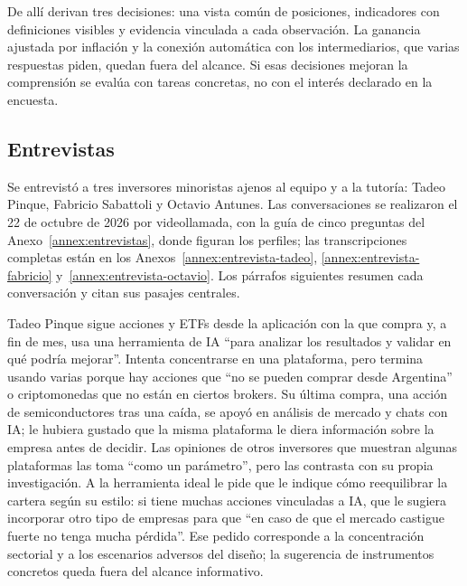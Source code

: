 De allí derivan tres decisiones: una vista común de posiciones, indicadores con definiciones visibles y evidencia vinculada a cada observación. La ganancia ajustada por inflación y la conexión automática con los intermediarios, que varias respuestas piden, quedan fuera del alcance. Si esas decisiones mejoran la comprensión se evalúa con tareas concretas, no con el interés declarado en la encuesta.

\subsection{Entrevistas}\label{subsec:entrevistas}

Se entrevistó a tres inversores minoristas ajenos al equipo y a la tutoría: Tadeo Pinque, Fabricio Sabattoli y Octavio Antunes. Las conversaciones se realizaron el 22 de octubre de 2026 por videollamada, con la guía de cinco preguntas del Anexo~\ref{annex:entrevistas}, donde figuran los perfiles; las transcripciones completas están en los Anexos~\ref{annex:entrevista-tadeo}, \ref{annex:entrevista-fabricio} y~\ref{annex:entrevista-octavio}. Los párrafos siguientes resumen cada conversación y citan sus pasajes centrales.

Tadeo Pinque sigue acciones y ETFs desde la aplicación con la que compra y, a fin de mes, usa una herramienta de IA \enquote{para analizar los resultados y validar en qué podría mejorar}. Intenta concentrarse en una plataforma, pero termina usando varias porque hay acciones que \enquote{no se pueden comprar desde Argentina} o criptomonedas que no están en ciertos brokers. Su última compra, una acción de semiconductores tras una caída, se apoyó en análisis de mercado y chats con IA; le hubiera gustado que la misma plataforma le diera información sobre la empresa antes de decidir. Las opiniones de otros inversores que muestran algunas plataformas las toma \enquote{como un parámetro}, pero las contrasta con su propia investigación. A la herramienta ideal le pide que le indique cómo reequilibrar la cartera según su estilo: si tiene muchas acciones vinculadas a IA, que le sugiera incorporar otro tipo de empresas para que \enquote{en caso de que el mercado castigue fuerte no tenga mucha pérdida}. Ese pedido corresponde a la concentración sectorial y a los escenarios adversos del diseño; la sugerencia de instrumentos concretos queda fuera del alcance informativo.

